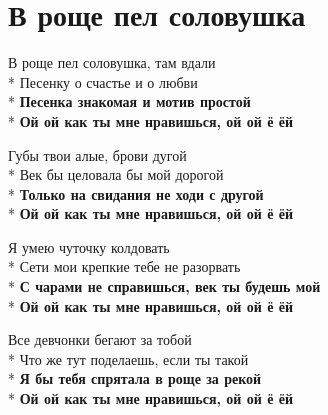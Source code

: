 \section{В роще пел соловушка}
\label{song:В_роще_пел_соловушка}

\medskip

\begin{minipage}{\linewidth}
В роще пел соловушка, там вдали\\*
Песенку о счастье и о любви\\*
\textbf{Песенка знакомая и мотив простой}\\*
\textbf{Ой ой как ты мне нравишься, ой ой ё ёй}\\
\end{minipage}\par\medskip\nobreak

\medskip

\begin{minipage}{\linewidth}
Губы твои алые, брови дугой\\*
Век бы целовала бы мой дорогой\\*
\textbf{Только на свидания не ходи с другой}\\*
\textbf{Ой ой как ты мне нравишься, ой ой ё ёй}\\
\end{minipage}\par\medskip\nobreak

\medskip

\begin{minipage}{\linewidth}
Я умею чуточку колдовать\\*
Сети мои крепкие тебе не разорвать\\*
\textbf{С чарами не справишься, век ты будешь мой}\\*
\textbf{Ой ой как ты мне нравишься, ой ой ё ёй}\\
\end{minipage}\par\medskip\nobreak

\medskip

\begin{minipage}{\linewidth}
Все девчонки бегают за тобой\\*
Что же тут поделаешь, если ты такой\\*
\textbf{Я бы тебя спрятала в роще за рекой}\\*
\textbf{Ой ой как ты мне нравишься, ой ой ё ёй}\\
\end{minipage}\par\medskip\nobreak

